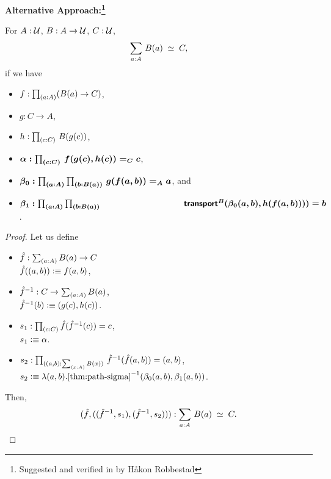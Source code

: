 \documentclass[centering]{report}
\newenvironment{slide}
    {\newpage
    \vspace*{\fill}
    }
    { 
     \vspace*{\fill}
    }
\begin{document}
\begin{slide}
\textbf{Alternative Approach:\footnote{\LARGE Suggested and verified in \Agda by Håkon Robbestad}}\\

\begin{lem} For $A:\mathcal{U}$, $B: A\to\mathcal{U}$, $C : \mathcal{U}$,
\begin{align*}
    \eqvspaced{\sm{a : A} B(a)}{C},
\end{align*}
if we have
\begin{itemize}
\item $f : \prd{a:A}(B(a)\rightarrow C)$,
\item $g : C\rightarrow A$,
\item $h : \prd{c:C}\,B(g(c))$,
\item $\boldsymbol{\alpha:\prd{c:C}\,f(g(c),h(c)) =_C c}$,
\item $\boldsymbol{\beta_0:\prd{a:A}{b:B(a)}\,g(f(a,b))=_A a}$, and
\item $\boldsymbol{\beta_1:\prd{a:A}{b:B(a)}}\\
\hspace*{35mm}\boldsymbol{\transfib{B}{\beta_{0}(a,b)}{h(f(a,b)))} = b}$.
\end{itemize}
\vspace*{\fill}
\end{lem}
\end{slide}

\begin{slide}
\begin{proof}
Let us define
\begin{itemize}
    \item $\hat{f} : \sm{a : A} B(a) \to C$ \\ $\hat{f}((a, b)) \vcentcolon\equiv f(a,b)$,
    \item $\opp{\hat{f}} : C \to \sm{a : A} B(a)$, \\
    $\mathord{{\hat{f}}^{-1}}(b)\vcentcolon\equiv (g(c), h(c))$.
\end{itemize}
\begin{itemize}
    \item $s_1 : \prd{c : C} \hat{f}(\opp{\hat{f}}(c)) = c$,\\
    $s_1 \vcentcolon\equiv \alpha$.
    \item $s_2 : \prd{(a,b) : \sm{x:A} B(x)}\, \opp{\hat{f}}(\hat{f}(a,b)) = (a,b)$,\\
    $s_2 \defeq \lambda (a,b).\opp{\text{\cref{thm:path-sigma}}}(\beta_0(a,b), \beta_1(a,b))$.
\end{itemize}
Then,
\begin{align*}
(\hat{f}, ((\opp{\hat{f}},s_1),(\opp{\hat{f}},s_2))) : \eqvspaced{\sm{a : A} B(a)}{C}.
\end{align*}
\end{proof}
\end{slide}
\end{document}

